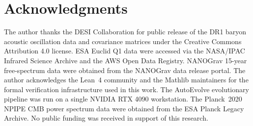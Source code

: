 \section*{Acknowledgments}

The author thanks the DESI Collaboration for public release of the DR1 baryon acoustic oscillation data and covariance matrices under the Creative Commons Attribution 4.0 license.  ESA Euclid Q1 data were accessed via the NASA/IPAC Infrared Science Archive and the AWS Open Data Registry.  NANOGrav 15-year free-spectrum data were obtained from the NANOGrav data release portal.  The author acknowledges the Lean~4 community and the Mathlib maintainers for the formal verification infrastructure used in this work.  The AutoEvolve evolutionary pipeline was run on a single NVIDIA RTX 4090 workstation.  The Planck~2020 NPIPE CMB power spectrum data were obtained from the ESA Planck Legacy Archive.  No public funding was received in support of this research.
